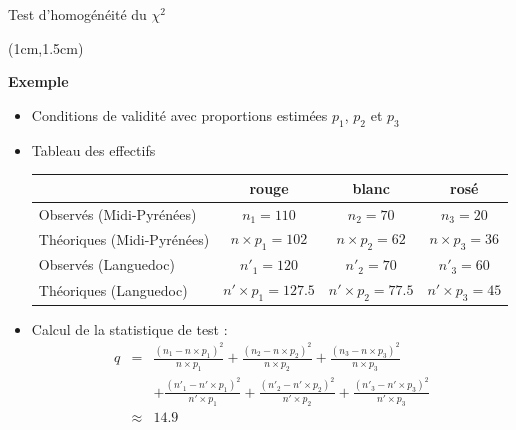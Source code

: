 \documentclass{beamer}
\begin{document}
\begin{frame}{Test d'homogénéité du $\chi^2$}
\begin{textblock*}{\textwidth}(1cm,1.5cm)

\begin{center}{\bf \Large Exemple} \end{center}

\small 

\begin{itemize}
\item Conditions de validité avec proportions estimées $p_1$, $p_2$ et $p_3$
\item Tableau des effectifs

\scriptsize
\hspace{-1cm}
\begin{tabular}{|l|c|c|c|}
\hline
        & rouge & blanc & rosé \\
\hline
Observés (Midi-Pyrénées) & $n_1=110$ & $n_2=70$ & $n_3=20$ \\
\hline
Théoriques (Midi-Pyrénées) & $n\times p_1=102 $ & $n\times p_2=62 $ 
 & $n\times p_3=36 $ \\
\hline
Observés (Languedoc) & $n'_1=120$ & $n'_2=70$ & $n'_3=60$ \\
\hline
Théoriques (Languedoc) & $n'\times p_1= 127.5$ & $n'\times p_2=77.5 $ 
& $n'\times p_3 = 45$ \\
\hline
\end{tabular}
\normalsize
\item Calcul de la statistique de test : 
\scriptsize
\begin{eqnarray*}
q & = & \frac{(n_1 - n\times p_1)^2}{n\times p_1} + \frac{(n_2 - n\times p_2)^2}{n\times p_2}
+ \frac{(n_3 - n\times p_3)^2}{n\times p_3} \\
  &    &  + \frac{(n'_1 - n'\times p_1)^2}{n'\times p_1} + \frac{(n'_2 - n'\times p_2)^2}{n'\times p_2}
+ \frac{(n'_3 - n'\times p_3)^2}{n'\times p_3}\\
  & \approx & 14.9
\end{eqnarray*}
\normalsize

\end{itemize}

\end{textblock*}

\end{frame}

\end{document}
